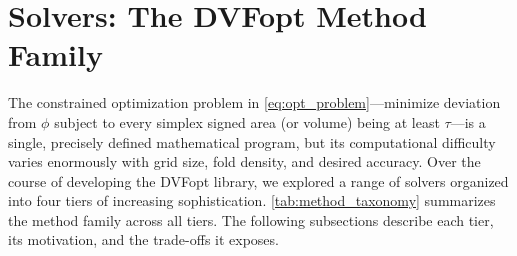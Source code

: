 \documentclass[lettersize,journal]{IEEEtran}
\begin{document}


\section{Solvers: The DVFopt Method Family}
\label{sec:solvers}

The constrained optimization problem in \autoref{eq:opt_problem}—minimize deviation from $\phi$ subject to every simplex signed area (or volume) being at least $\tau$—is a single, precisely defined mathematical program, but its computational difficulty varies enormously with grid size, fold density, and desired accuracy. Over the course of developing the DVFopt library, we explored a range of solvers organized into four tiers of increasing sophistication. \autoref{tab:method_taxonomy} summarizes the method family across all tiers. The following subsections describe each tier, its motivation, and the trade-offs it exposes.
\end{document}
